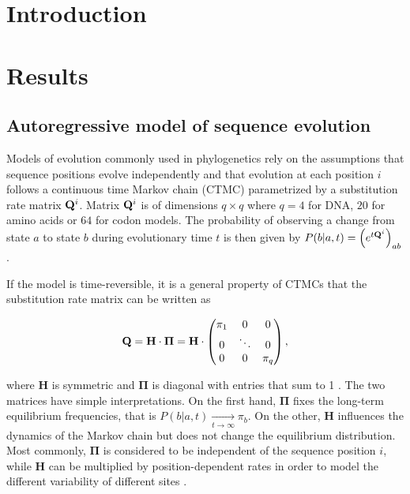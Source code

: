 
\section{Introduction}

\section{Results} %
\label{sub:results}

\subsection{Autoregressive model of sequence evolution} 
\label{sub:autoregressive_sequence_evolution_model}

Models of evolution commonly used in phylogenetics rely on the assumptions that sequence positions evolve independently and that evolution at each position $i$ follows a continuous time Markov chain (CTMC) parametrized by a substitution rate matrix $\mathbf{Q}^i$. 
Matrix $\mathbf{Q}^i$ is of dimensions $q \times q$ where $q=4$ for DNA, $20$ for amino acids or $64$ for codon models.
The probability of observing a change from state $a$ to state $b$ during evolutionary time $t$ is then given by $P(b \vert a, t) = \left( e^{t\mathbf{Q}^i} \right)_{ab}$.

If the model is time-reversible, it is a general property of CTMCs that the substitution rate matrix can be written as 

\begin{equation}
	\label{eq:Q_decomposition}
	\mathbf{Q} = \mathbf{H}\cdot \mathbf{\Pi} = \mathbf{H} \cdot \begin{pmatrix}
		\pi_1 & 0 & 0\\ 
		0 & \ddots & 0 \\
		0 & 0 & \pi_q
	\end{pmatrix},
\end{equation}

where $\mathbf{H}$ is symmetric and $\mathbf{\Pi}$ is diagonal with entries that sum to 1 \cite{yang_computationalmolecularevolution_2006}. 
The two matrices have simple interpretations. 
On the first hand, $\mathbf{\Pi}$ fixes the long-term equilibrium frequencies, that is $P(b \vert a, t) \xrightarrow[t \rightarrow \infty]{} \pi_b$.
On the other, $\mathbf{H}$ influences the dynamics of the Markov chain but does not change the equilibrium distribution. 
Most commonly, $\mathbf{\Pi}$ is considered to be independent of the sequence position $i$, while $\mathbf{H}$ can be multiplied by position-dependent rates in order to model the different variability of different sites \cite{yang_maximumlikelihoodphylogenetic_1994,stamatakis_raxmlversiontool_2014,nguyen_iqtreefasteffective_2015}. \\


